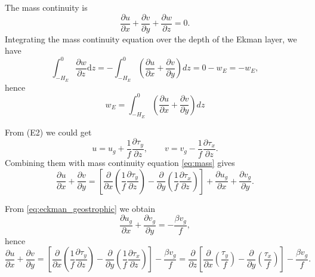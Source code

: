 \documentclass[a4paper]{article}
\begin{document}
\begin{enumerate}[label=\textbf{\arabic*.}]
\begin{enumerate}[label=\textbf{(\alph*)}]
			
			The mass continuity is 
			\begin{equation}\label{eq:mass}
			\frac { \partial u } { \partial x } + \frac { \partial v } { \partial y } + \frac { \partial w } { \partial z } = 0.
			\end{equation}
			Integrating the mass continuity equation over the depth of the Ekman
			layer, we have
			$$\int_{-H_{E}}^{0} \frac{ \partial w}{\partial z} \mathrm{d}z =-\int_{-H_{E}}^{0} \left( \frac { \partial u } { \partial x } + \frac { \partial v} { \partial y }\right)dz = 0-w_E=-w_E,$$
			hence
			\begin{equation}\label{eq:w_e}
				w_E = \int_{-H_{E}}^{0} \left( \frac { \partial u } { \partial x } + \frac { \partial v} { \partial y }\right)dz
			\end{equation}
			
			From (E2) we could get
			$$u = u_g+ \frac{1}{f} \frac{\partial \tau_y}{\partial z} , \qquad v = v_g -\frac{1}{f} \frac{\partial \tau_x}{\partial z}. $$
			Combining them with mass continuity equation \eqref{eq:mass} gives
			$$\frac { \partial u } { \partial x } + \frac { \partial v } { \partial y } = \left[\frac{\partial }{\partial x} \left( \frac{1}{f}\frac{\partial \tau_y}{\partial z} \right) - \frac{\partial }{\partial y} \left( \frac{1}{f}\frac{\partial \tau_x}{\partial z} \right) \right] + \frac { \partial u_g } { \partial x } + \frac { \partial v_g } { \partial y }.$$
			
			From \eqref{eq:eckman_geostrophic} we obtain 	
			$$\frac { \partial u_g } { \partial x } + \frac { \partial v_g } { \partial y } = -\frac{\beta v_g}{f},$$
			hence
			$$\frac { \partial u } { \partial x } + \frac { \partial v } { \partial y } = \left[\frac{\partial }{\partial x} \left( \frac{1}{f}\frac{\partial \tau_y}{\partial z} \right) - \frac{\partial }{\partial y} \left( \frac{1}{f}\frac{\partial \tau_x}{\partial z} \right) \right] -\frac{\beta v_g}{f} = \frac { \partial } {\partial z} \left[\frac{\partial }{\partial x} \left(\frac{\tau_y}{f}\right)- \frac{\partial }{\partial y}\left(\frac{\tau_x}{f}\right) \right]  -\frac{\beta v_g}{f}.$$
			

\end{enumerate}
\end{enumerate}
\end{document}
